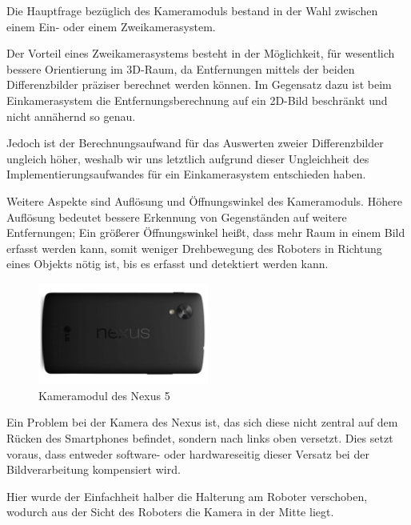 Die Hauptfrage bezüglich des Kameramoduls bestand in der Wahl zwischen einem Ein- oder einem Zweikamerasystem.

Der Vorteil eines Zweikamerasystems besteht in der Möglichkeit, für wesentlich bessere Orientierung im 3D-Raum, da Entfernungen mittels der beiden Differenzbilder präziser berechnet werden können.
Im Gegensatz dazu ist beim Einkamerasystem die Entfernungsberechnung auf ein 2D-Bild beschränkt und nicht annähernd so genau.

Jedoch ist der Berechnungsaufwand für das Auswerten zweier Differenzbilder ungleich höher, weshalb wir uns letztlich aufgrund dieser Ungleichheit des Implementierungsaufwandes für ein Einkamerasystem entschieden haben.

Weitere Aspekte sind Auflösung und Öffnungswinkel des Kameramoduls.
Höhere Auflösung bedeutet bessere Erkennung von Gegenständen auf weitere Entfernungen; Ein größerer Öffnungswinkel heißt, dass mehr Raum in einem Bild erfasst werden kann, somit weniger Drehbewegung des Roboters in Richtung eines Objekts nötig ist, bis es erfasst und detektiert werden kann.

\begin{figure}[h]
\centering
\includegraphics[width=0.5\textwidth]{Bilder/Robot/nexus_backside}
\caption{Kameramodul des Nexus 5}
\label{fig:camera}
\end{figure}

Ein Problem bei der Kamera des Nexus ist, das sich diese nicht zentral auf dem Rücken des Smartphones befindet, sondern nach links oben versetzt. Dies setzt voraus, dass entweder software- oder hardwareseitig dieser Versatz bei der Bildverarbeitung kompensiert wird.

Hier wurde der Einfachheit halber die Halterung am Roboter verschoben, wodurch aus der Sicht des Roboters die Kamera in der Mitte liegt.
